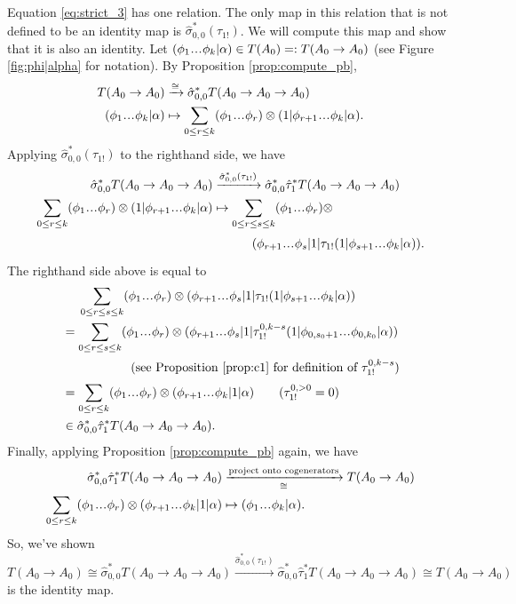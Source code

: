 Equation \ref{eq:strict_3} has one relation. 
The only map in this relation that is not 
defined to be an identity map is $\hat{\sigma}_{0,0}^*
(\tau_{1!})$. We will compute this map and 
show that it is also an identity. 
Let $(\phi_1\smdots \phi_k|\alpha)
\in T(A_0) =: T(A_0 \to A_0)$ (see Figure \ref{fig:phi|alpha} 
for notation). By Proposition \ref{prop:compute_pb},
\begin{align*}
T(A_0 \to A_0)
&\xrightarrow{\cong} 
\hat{\sigma}_{0,0}^*T(A_0 \to A_0 \to A_0)\\
(\phi_1\smdots \phi_k|\alpha)
&\mapsto
\sum \limits_{0 \leq r \leq k}
  (\phi_1\smdots \phi_r) \otimes 
  (1 | \phi_{r+1}\smdots \phi_k|\alpha).
\end{align*}
Applying $\hat{\sigma}_{0,0}^*(\tau_{1!})$
to the righthand side, we have
\begin{align*}
\hat{\sigma}_{0,0}^*T(A_0 \to A_0 \to A_0)
&\xrightarrow{\hat{\sigma}_{0,0}^*(\tau_{1!})}
\hat{\sigma}_{0,0}^*\hat{\tau}_1^*T(A_0 \to A_0 \to A_0)\\
\sum \limits_{0 \leq r \leq k}
  (\phi_1\smdots \phi_r) \otimes 
  (1 | \phi_{r+1}\smdots \phi_k|\alpha)
&\mapsto
\sum \limits_{0 \leq r \leq s \leq k}
  (\phi_1\smdots \phi_r) \otimes \\
&\phantom{{}\mapsto \sum{}}  
  (\phi_{r+1}\smdots \phi_s|1|
  \tau_{1!}(1|\phi_{s+1}\smdots\phi_k|\alpha)).
\end{align*}
The righthand side above is equal to
\begin{align*}
&\phantom{{}={}}
\sum \limits_{0 \leq r \leq s \leq k}
  (\phi_1\smdots \phi_r) \otimes 
  (\phi_{r+1}\smdots \phi_s|1|
  \tau_{1!}(1|\phi_{s+1}\smdots\phi_k|\alpha))\\
&=  
\sum \limits_{0 \leq r \leq s \leq k}
  (\phi_1\smdots \phi_r) \otimes 
  (\phi_{r+1}\smdots \phi_s|1|
  \tau_{1!}^{0,k-s}(1|\phi_{0,s_0+1}\smdots\phi_{0,k_0}|\alpha))\\
&\phantom{{}=\sum\sum{}}  
  \quad \textrm{(see Proposition \ref{prop:c1} for definition of }
  \tau_{1!}^{0,k-s})\\
&=  
\sum \limits_{0 \leq r \leq k}
  (\phi_1\smdots \phi_r) \otimes 
  (\phi_{r+1}\smdots \phi_k|1|\alpha)
  \quad \quad (\tau_{1!}^{0,>0}=0)\\
&\in
\hat{\sigma}_{0,0}^*\hat{\tau}_1^*T(A_0 \to A_0 \to A_0).
\end{align*}
Finally, applying Proposition 
\ref{prop:compute_pb} again, we have
\begin{align*}
\hat{\sigma}_{0,0}^*\hat{\tau}_1^*T(A_0 \to A_0 \to A_0)
&\xrightarrow[\cong]{\textrm{project onto cogenerators}} 
T(A_0 \to A_0)\\
\sum \limits_{0 \leq r \leq k}
  (\phi_1\smdots \phi_r) \otimes 
  (\phi_{r+1}\smdots \phi_k|1|\alpha)
&\mapsto
(\phi_1\smdots \phi_k|\alpha).
\end{align*}
So, we've shown 
$$
T(A_0 \to A_0) \cong 
\hat{\sigma}_{0,0}^*T(A_0 \to A_0 \to A_0)
\xrightarrow{\hat{\sigma}_{0,0}^*(\tau_{1!})}
\hat{\sigma}_{0,0}^*\hat{\tau}_1^*T(A_0 \to A_0 \to A_0)
\cong T(A_0 \to A_0)
$$
is the identity map.
% 
